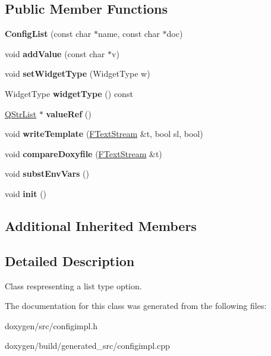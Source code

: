 \subsection*{Public Member Functions}
\begin{DoxyCompactItemize}
\item 
\mbox{\label{class_config_list_aae0b9ca88cb622aec4b31270c1c1f944}} 
{\bfseries Config\+List} (const char $\ast$name, const char $\ast$doc)
\item 
\mbox{\label{class_config_list_a708f7e2019c42d2d1d8957ee33b94518}} 
void {\bfseries add\+Value} (const char $\ast$v)
\item 
\mbox{\label{class_config_list_a0e85c4f20ca576934f53e7d6a9361896}} 
void {\bfseries set\+Widget\+Type} (Widget\+Type w)
\item 
\mbox{\label{class_config_list_adffbf5f943f39a95d16140d3d2d8eec9}} 
Widget\+Type {\bfseries widget\+Type} () const
\item 
\mbox{\label{class_config_list_aebf1360b92b390ff0ec638684ac0ef9b}} 
\mbox{\hyperlink{class_q_str_list}{Q\+Str\+List}} $\ast$ {\bfseries value\+Ref} ()
\item 
\mbox{\label{class_config_list_abd14c6ac16fd90f2e501ab10bb61344f}} 
void {\bfseries write\+Template} (\mbox{\hyperlink{class_f_text_stream}{F\+Text\+Stream}} \&t, bool sl, bool)
\item 
\mbox{\label{class_config_list_afec4ad99e7ae75bbdf71a9c6b2258165}} 
void {\bfseries compare\+Doxyfile} (\mbox{\hyperlink{class_f_text_stream}{F\+Text\+Stream}} \&t)
\item 
\mbox{\label{class_config_list_a46cdc3f64d1799a802fb2d00af2e3f65}} 
void {\bfseries subst\+Env\+Vars} ()
\item 
\mbox{\label{class_config_list_a48019d23edc37549f47d41ce41c43298}} 
void {\bfseries init} ()
\end{DoxyCompactItemize}
\subsection*{Additional Inherited Members}


\subsection{Detailed Description}
Class respresenting a list type option. 

The documentation for this class was generated from the following files\+:\begin{DoxyCompactItemize}
\item 
doxygen/src/configimpl.\+h\item 
doxygen/build/generated\+\_\+src/configimpl.\+cpp\end{DoxyCompactItemize}
